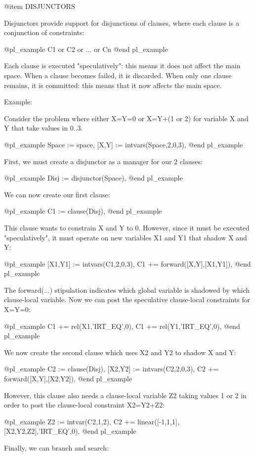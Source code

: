 @item DISJUNCTORS


Disjunctors provide support for disjunctions of clauses, where each clause is a
conjunction of constraints:

@pl_example
    C1 or C2 or ... or Cn
@end pl_example


Each clause is executed "speculatively": this means it does not affect the main
space.  When a clause becomes failed, it is discarded.  When only one clause
remains, it is committed: this means that it now affects the main space.

Example:

Consider the problem where either X=Y=0 or X=Y+(1 or 2) for variable X and Y
that take values in 0..3.

@pl_example
    Space := space,
    [X,Y] := intvars(Space,2,0,3),
@end pl_example

First, we must create a disjunctor as a manager for our 2 clauses:

@pl_example
    Disj := disjunctor(Space),
@end pl_example

We can now create our first clause:

@pl_example
    C1 := clause(Disj),
@end pl_example


This clause wants to constrain X and Y to 0.  However, since it must be
executed "speculatively", it must operate on new variables X1 and Y1 that
shadow X and Y:

@pl_example
    [X1,Y1] := intvars(C1,2,0,3),
    C1 += forward([X,Y],[X1,Y1]),
@end pl_example

The forward(...) stipulation indicates which global variable is shadowed by
which clause-local variable.  Now we can post the speculative clause-local
constraints for X=Y=0:

@pl_example
    C1 += rel(X1,'IRT_EQ',0),
    C1 += rel(Y1,'IRT_EQ',0),
@end pl_example

We now create the second clause which uses X2 and Y2 to shadow X and Y:

@pl_example
    C2 := clause(Disj),
    [X2,Y2] := intvars(C2,2,0,3),
    C2 += forward([X,Y],[X2,Y2]),
@end pl_example

However, this clause also needs a clause-local variable Z2 taking values 1 or
2 in order to post the clause-local constraint X2=Y2+Z2:

@pl_example
    Z2 := intvar(C2,1,2),
    C2 += linear([-1,1,1],[X2,Y2,Z2],'IRT_EQ',0),
@end pl_example

Finally, we can branch and search:

